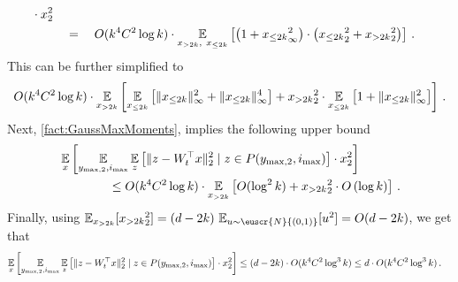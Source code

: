 \documentclass[11pt,letterpaper]{article}
\theoremstyle{plain}
\theoremstyle{definition}
\theoremstyle{remark}
\newcommand{\sinparen}[1]{\ensuremath{(#1)}}
\newcommand{\inparen}[1]{\ensuremath{\left(#1\right)}}
\newcommand{\insquare}[1]{\ensuremath{\left[#1\right]}}
\newcommand{\snorm}[1]{\ensuremath{\ensuremath{\| #1 \|}}}
\let\norm\relax
\newcommand{\norm}[1]{\ensuremath{\left\lVert #1 \right\rVert}}
\newcommand{\E}{\operatornamewithlimits{\mathbb{E}}}
\newcommand{\Ex}{\E}
\newcommand{\customcal}[1]{\euscr{#1}}
\newcommand{\cN}{\customcal{N}}
\newcommand{\normal}[2]{\cN{\inparen{#1,#2}}}
\newcommand{\smax}{\max,2} %
\newcommand{\imax}{i_{\max}}
\newcommand{\ysmax}{y_{\smax}}
\begin{document}
{{\begin{align*}
{{                }
                \cdot 
                \norm{x}_2^2 
                }\\
                &\quad=\quad
                {O(k^4C^2\log{k})}
                \cdot \Ex_{x_{>2k},~x_{\leq 2k}}\insquare{
                    {
                        \inparen{
                            1
                            + \norm{x_{\leq 2k}}_\infty^2
                        }
                        \cdot 
                        \inparen{
                            \norm{x_{\leq 2k}}_2^2 
                            + 
                            \norm{x_{> 2k}}_2^2 
                        }
                    }
                }\,.
            \end{align*}
            This can be further simplified to  
            \[
                {O(k^4C^2\log{k})}
                \cdot \Ex_{x_{>2k}}
                    \insquare{
                        \Ex_{x_{\leq 2k}}\insquare{
                            \snorm{x_{\leq 2k}}_\infty^2
                            + \snorm{x_{\leq 2k}}_\infty^4
                        }
                        + 
                        \norm{x_{> 2k}}_2^2 \cdot 
                        \Ex_{x_{\leq 2k}}\insquare{
                            1
                            + \snorm{x_{\leq 2k}}_\infty^2
                        }
                    }\,.
            \]
            Next, \cref{fact:GaussMaxMoments}, implies the following upper bound 
            \begin{align*}
                &\Ex_{x}\insquare{
                \Ex_{\ysmax,\imax}
                \Ex_z\insquare{
                    \snorm{z - W_t^\top x}_2^2  \mid z\in P(\ysmax,\imax)
                }
                \cdot 
                \norm{x}_2^2 
                }\\
                &\qquad\qquad\leq
                    {O(k^4C^2\log{k})}
                    \cdot \Ex_{x_{> 2k}}\insquare{
                    O\sinparen{\log^2{k}}
                    + \norm{x_{> 2k}}_2^2 \cdot O\inparen{\log{k}}
                }\,.
            \end{align*}
            Finally, using $\Ex_{x_{>2k}}[\norm{x_{>2k}}_2^2]=(d-2k)\,\Ex_{u\sim \normal{0}{1}}[u^2]=O(d-2k)$, we get that 
            \begin{align*}
                \Ex_{x}\insquare{
                \Ex_{\ysmax,\imax}
                \Ex_z\insquare{
                    \snorm{z - W_t^\top x}_2^2  \mid z\in P(\ysmax,\imax)
                }
                \cdot 
                \norm{x}_2^2 
                }
                &\leq
                (d-2k)\cdot {O(k^4C^2\log^3{k})}
                \leq d\cdot {O(k^4C^2\log^3{k})}\,.
            \end{align*}
            
}}
\end{document}
